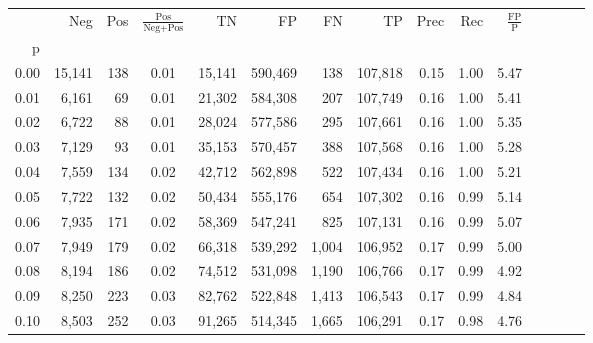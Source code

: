 \begin{tabular}{rrrcrrrrrrrrrrr}
\toprule
{} &     Neg &    Pos & $\frac{\text{Pos}}{\text{Neg}+\text{Pos}}$ &       TN &       FP &       FN &       TP &  Prec &   Rec & $\frac{\text{FP}}{\text{P}}$ \\
p    &         &        &                                            &          &          &          &          &       &       &                              \\
\midrule
0.00 &  15,141 &    138 &                                       0.01 &   15,141 &  590,469 &      138 &  107,818 &  0.15 &  1.00 &                         5.47 \\
0.01 &   6,161 &     69 &                                       0.01 &   21,302 &  584,308 &      207 &  107,749 &  0.16 &  1.00 &                         5.41 \\
0.02 &   6,722 &     88 &                                       0.01 &   28,024 &  577,586 &      295 &  107,661 &  0.16 &  1.00 &                         5.35 \\
0.03 &   7,129 &     93 &                                       0.01 &   35,153 &  570,457 &      388 &  107,568 &  0.16 &  1.00 &                         5.28 \\
0.04 &   7,559 &    134 &                                       0.02 &   42,712 &  562,898 &      522 &  107,434 &  0.16 &  1.00 &                         5.21 \\
0.05 &   7,722 &    132 &                                       0.02 &   50,434 &  555,176 &      654 &  107,302 &  0.16 &  0.99 &                         5.14 \\
0.06 &   7,935 &    171 &                                       0.02 &   58,369 &  547,241 &      825 &  107,131 &  0.16 &  0.99 &                         5.07 \\
0.07 &   7,949 &    179 &                                       0.02 &   66,318 &  539,292 &    1,004 &  106,952 &  0.17 &  0.99 &                         5.00 \\
0.08 &   8,194 &    186 &                                       0.02 &   74,512 &  531,098 &    1,190 &  106,766 &  0.17 &  0.99 &                         4.92 \\
0.09 &   8,250 &    223 &                                       0.03 &   82,762 &  522,848 &    1,413 &  106,543 &  0.17 &  0.99 &                         4.84 \\
0.10 &   8,503 &    252 &                                       0.03 &   91,265 &  514,345 &    1,665 &  106,291 &  0.17 &  0.98 &                         4.76 \\

\end{tabular}
